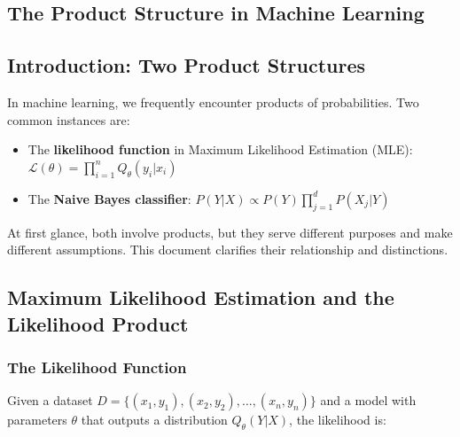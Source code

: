 \begin{notechapter}
\chapter{The Product Structure in Machine Learning}\label{ch:product-structure}

\begin{abstract}
    This document explores the product structures that appear in machine learning, particularly focusing on the relationship between the likelihood function in maximum likelihood estimation and the factorization in Naive Bayes models. While both involve products of probabilities, they represent fundamentally different concepts and assumptions. We clarify these differences and show how they interact when training probabilistic models.
\end{abstract}

\section{Introduction: Two Product Structures}

In machine learning, we frequently encounter products of probabilities. Two common instances are:

\begin{itemize}
    \item The \textbf{likelihood function} in Maximum Likelihood Estimation (MLE): $\mathcal{L}(\theta) = \prod_{i=1}^n Q_\theta(y_i|x_i)$
    \item The \textbf{Naive Bayes classifier}: $P(Y|X) \propto P(Y) \prod_{j=1}^d P(X_j|Y)$
\end{itemize}

At first glance, both involve products, but they serve different purposes and make different assumptions. This document clarifies their relationship and distinctions.

\section{Maximum Likelihood Estimation and the Likelihood Product}

\subsection{The Likelihood Function}

Given a dataset $D = \{(x_1, y_1), (x_2, y_2), \ldots, (x_n, y_n)\}$ and a model with parameters $\theta$ that outputs a distribution $Q_\theta(Y|X)$, the likelihood is:


\end{notechapter}

